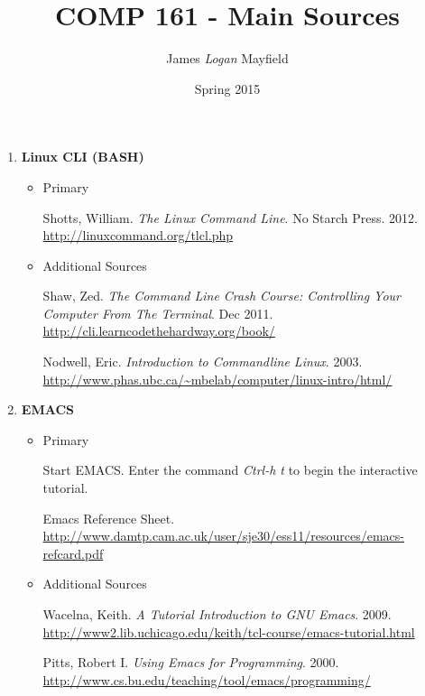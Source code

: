 \documentclass[10pt]{article}
\title{COMP 161 - Main Sources}
\author{ James \textit{Logan} Mayfield }
\date{Spring 2015}
\begin{document}
\maketitle

\begin{enumerate}
\item \textbf{Linux CLI (BASH)}
\begin{itemize}
\item Primary 

Shotts, William. \textit{The Linux Command Line}. No Starch Press. 2012. 
\newline \url{http://linuxcommand.org/tlcl.php}

\item Additional Sources

Shaw, Zed. \textit{The Command Line Crash Course: Controlling Your Computer From The Terminal}. Dec 2011. 
\newline \url{http://cli.learncodethehardway.org/book/}
\vspace{.25in}

Nodwell, Eric. \textit{Introduction to Commandline Linux}. 2003.
\newline \url{http://www.phas.ubc.ca/~mbelab/computer/linux-intro/html/}
\end{itemize}

\item \textbf{EMACS}
\begin{itemize}
\item Primary

Start EMACS. Enter the command \textit{Ctrl-h t} to begin the interactive tutorial.
\newline

Emacs Reference Sheet. \newline
\url{http://www.damtp.cam.ac.uk/user/sje30/ess11/resources/emacs-refcard.pdf}	


\item Additional Sources

Wacelna, Keith. \textit{A Tutorial Introduction to GNU Emacs}. 2009.
\newline \url{http://www2.lib.uchicago.edu/keith/tcl-course/emacs-tutorial.html}
\vspace{.25in}

Pitts, Robert I. \textit{Using Emacs for Programming}. 2000. 
\newline \url{http://www.cs.bu.edu/teaching/tool/emacs/programming/} 
\vspace{.25in}


\end{itemize}
\end{enumerate}
\end{document}
